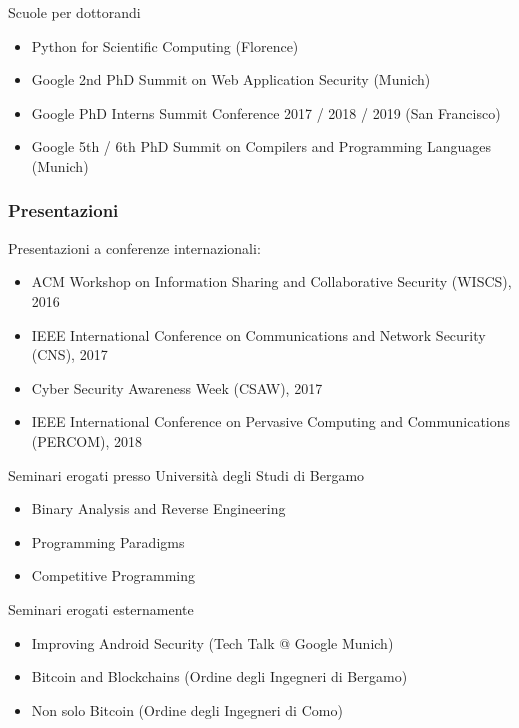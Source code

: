 \documentclass{article}
\begin{document}
\smallskip
\noindent Scuole per dottorandi

\begin{itemize}
	\item Python for Scientific Computing (Florence)
	\item Google 2nd PhD Summit on Web Application Security (Munich)
	\item Google PhD Interns Summit Conference 2017 / 2018 / 2019 (San Francisco)
	\item Google 5th / 6th PhD Summit on Compilers and Programming Languages (Munich)
\end{itemize}

\subsubsection*{Presentazioni}

Presentazioni a conferenze internazionali:

\begin{itemize}
	\item ACM Workshop on Information Sharing and Collaborative Security (WISCS), 2016
	\item IEEE International Conference on Communications and Network Security (CNS), 2017
	\item Cyber Security Awareness Week (CSAW), 2017
	\item IEEE International Conference on Pervasive Computing and Communications (PERCOM), 2018
\end{itemize}

\noindent Seminari erogati presso Università degli Studi di Bergamo

\begin{itemize}
	\item Binary Analysis and Reverse Engineering
	\item Programming Paradigms
	\item Competitive Programming
\end{itemize}

\noindent Seminari erogati esternamente

\begin{itemize}
	\item Improving Android Security (Tech Talk @ Google Munich)
	\item Bitcoin and Blockchains (Ordine degli Ingegneri di Bergamo)
	\item Non solo Bitcoin (Ordine degli Ingegneri di Como)
\end{itemize}
\end{document}
